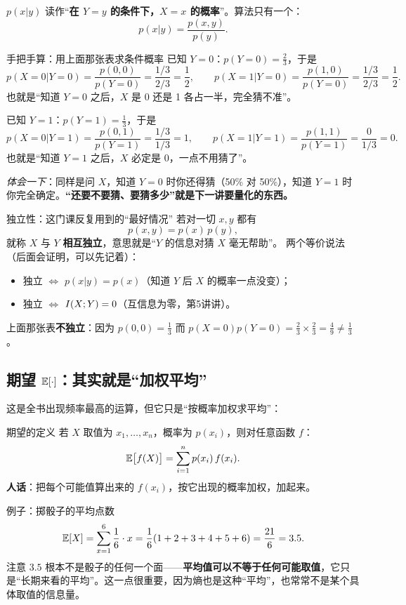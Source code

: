 $p(x|y)$ 读作“\textbf{在 $Y=y$ 的条件下，$X=x$ 的概率}”。算法只有一个：
\[
p(x|y)=\frac{p(x,y)}{p(y)} .
\]
\begin{calc}{手把手算：用上面那张表求条件概率}
已知 $Y=0$：$p(Y=0)=\frac23$，于是
\[
p(X=0|Y=0)=\frac{p(0,0)}{p(Y=0)}=\frac{1/3}{2/3}=\frac12,\qquad
p(X=1|Y=0)=\frac{p(1,0)}{p(Y=0)}=\frac{1/3}{2/3}=\frac12 .
\]
也就是“知道 $Y=0$ 之后，$X$ 是 0 还是 1 各占一半，完全猜不准”。

已知 $Y=1$：$p(Y=1)=\frac13$，于是
\[
p(X=0|Y=1)=\frac{p(0,1)}{p(Y=1)}=\frac{1/3}{1/3}=1,\qquad
p(X=1|Y=1)=\frac{p(1,1)}{p(Y=1)}=\frac{0}{1/3}=0 .
\]
也就是“知道 $Y=1$ 之后，$X$ 必定是 0，一点不用猜了”。

\emph{体会一下}：同样是问 $X$，知道 $Y=0$ 时你还得猜（50\% 对 50\%），知道 $Y=1$ 时你完全确定。\textbf{“还要不要猜、要猜多少”就是下一讲要量化的东西。}
\end{calc}

\begin{defbox}{独立性：这门课反复用到的“最好情况”}
若对一切 $x,y$ 都有
\[
p(x,y)=p(x)\,p(y),
\]
就称 $X$ 与 $Y$ \textbf{相互独立}，意思就是“$Y$ 的信息对猜 $X$ 毫无帮助”。
两个等价说法（后面会证明，可以先记着）：
\begin{itemize}[leftmargin=1.6em,itemsep=1pt,topsep=1pt]
  \item 独立 $\iff$ $p(x|y)=p(x)$（知道 $Y$ 后 $X$ 的概率一点没变）；
  \item 独立 $\iff$ $I\!\left(X;Y\right)=0$（互信息为零，第5讲讲）。
\end{itemize}
上面那张表\textbf{不独立}：因为 $p(0,0)=\frac13$ 而 $p(X=0)p(Y=0)=\frac23\times\frac23=\frac49\ne\frac13$。
\end{defbox}

\subsection{期望 $\operatorname{\mathbb{E}}[\cdot]$：其实就是“加权平均”}

这是全书出现频率最高的运算，但它只是“按概率加权求平均”：

\begin{defbox}{期望的定义}
若 $X$ 取值为 $x_1,\dots,x_n$，概率为 $p(x_i)$，则对任意函数 $f$：
\[
\operatorname{\mathbb{E}}\bigl[f(X)\bigr]=\sum_{i=1}^{n}p(x_i)\,f(x_i).
\]
\textbf{人话}：把每个可能值算出来的 $f(x_i)$，按它出现的概率加权，加起来。
\end{defbox}

\begin{calc}{例子：掷骰子的平均点数}
\[
\operatorname{\mathbb{E}}[X]=\sum_{x=1}^{6}\frac16\cdot x=\frac16(1+2+3+4+5+6)=\frac{21}{6}=3.5 .
\]
注意 $3.5$ 根本不是骰子的任何一个面——\textbf{平均值可以不等于任何可能取值}，它只是“长期来看的平均”。这一点很重要，因为熵也是这种“平均”，也常常不是某个具体取值的信息量。
\end{calc}

